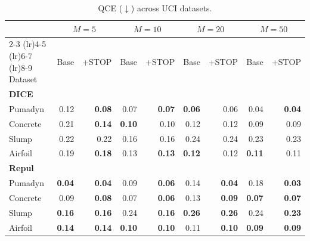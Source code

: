 \documentclass[sigconf]{acmart}
\begin{document}
\begin{table}[!ht]
\centering
\caption{QCE ($\downarrow$) across UCI datasets.}
\label{tab:uci_qce}
\scriptsize
\setlength{\tabcolsep}{3pt}
\begin{tabular}{lrrrrrrrr}
\toprule
& \multicolumn{2}{c}{$M=5$}
& \multicolumn{2}{c}{$M=10$}
& \multicolumn{2}{c}{$M=20$}
& \multicolumn{2}{c}{$M=50$} \\
\cmidrule(lr){2-3} \cmidrule(lr){4-5}
\cmidrule(lr){6-7} \cmidrule(lr){8-9}
Dataset
& Base & +STOP
& Base & +STOP
& Base & +STOP
& Base & +STOP \\
\midrule

\multicolumn{9}{l}{\textbf{DICE}} \\
Pumadyn  & 0.12 & \textbf{0.08} & 0.07 & \textbf{0.07} & \textbf{0.06} & 0.06 & 0.04 & \textbf{0.04} \\
Concrete & 0.21 & \textbf{0.14} & \textbf{0.10} & 0.10 & 0.12 & 0.12 & 0.09 & 0.09 \\
Slump    & 0.22 & 0.22 & 0.16 & 0.16 & 0.24 & 0.24 & 0.23 & 0.23 \\
Airfoil  & 0.19 & \textbf{0.18} & 0.13 & \textbf{0.13} & \textbf{0.12} & 0.12 & \textbf{0.11} & 0.11 \\

\midrule

\multicolumn{9}{l}{\textbf{Repul}} \\
Pumadyn  & \textbf{0.04} & \textbf{0.04} & 0.09 & \textbf{0.06} & 0.14 & \textbf{0.04} & 0.18 & \textbf{0.03} \\
Concrete & 0.09 & \textbf{0.08} & 0.07 & \textbf{0.06} & 0.13 & \textbf{0.09} & \textbf{0.07} & \textbf{0.07} \\
Slump    & \textbf{0.16} & \textbf{0.16} & 0.24 & \textbf{0.16} & \textbf{0.26} & \textbf{0.26} & 0.24 & \textbf{0.23} \\
Airfoil  & \textbf{0.14} & \textbf{0.14} & \textbf{0.10} & \textbf{0.10} & 0.11 & \textbf{0.10} & \textbf{0.09} & \textbf{0.09} \\

\bottomrule
\end{tabular}
\end{table}
\end{document}
